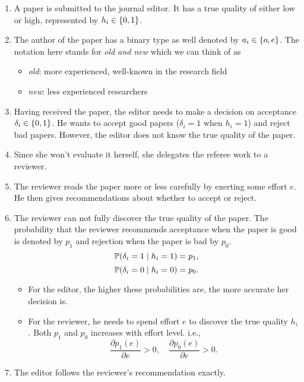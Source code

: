 \documentclass[12pt]{article}
\begin{document}
\begin{enumerate}
    \item A paper is submitted to the journal editor. It has a true quality of either low
          or high, represented by $h_i \in \left\{0,1\right\}$.
    \item The author of the paper has a binary type as well denoted by $a_i\in
              \left\{o,e\right\}$. The notation here stands for \textit{old and new} which we can
          think of as \begin{itemize}
              \item \textit{old}: more experienced, well-known in the research field
              \item \textit{new}: less experienced researchers
          \end{itemize}
    \item Having received the paper, the editor needs to make a decision on acceptance
          $\delta_i\in\left\{0,1\right\}$. He wants to accept good papers ($\delta_i=1$ when
          $h_i=1$) and reject bad papers. However, the editor does not know the true
          quality of the paper.
    \item Since she won't evaluate it herself, she delegates the referee work to a
          reviewer.
    \item The reviewer reads the paper more or less carefully by exerting some effort
          $e$. He then gives recommendations about whether to accept or reject.
    \item The reviewer can not fully discover the true quality of the paper. The
          probability that the reviewer recommends acceptance when the paper is good is
          denoted by $p_1$ and rejection when the paper is bad by $p_0$.
          \[
              \mathbb{P}(\delta_i = 1 \mid h_i = 1) = p_1,
          \]
          \[
              \mathbb{P}(\delta_i = 0 \mid h_i = 0) = p_0.
          \]
          \begin{itemize}
              \item For the editor, the higher these probabilities are, the more accurate her
                    decision is.
              \item For the reviewer, he needs to spend effort $e$ to discover the true quality
                    $h_i$. Both $p_1$ and $p_0$ increases with effort level. i.e.,
                    \[
                        \frac{\partial p_1(e)}{\partial e} > 0, \quad \frac{\partial p_0(e)}{\partial e} > 0.
                    \]
          \end{itemize}
    \item The editor follows the reviewer's recommendation exactly.
\end{enumerate}
\end{document}
